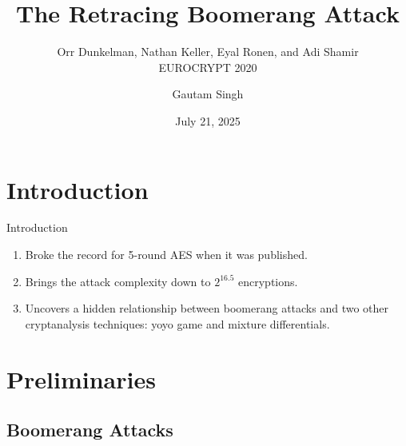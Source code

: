 \documentclass[notheorems]{beamer}
\title{The Retracing Boomerang Attack}
\subtitle{Orr Dunkelman, Nathan Keller, Eyal Ronen, and Adi Shamir\\EUROCRYPT 2020}
\author{Gautam Singh}
\institute[IITH]{Indian Institute of Technology Hyderabad}
\date{July 21, 2025}
\theoremstyle{definition}
\theoremstyle{example}
\begin{document}
    
    \begin{frame}
        \titlepage
    \end{frame}
    
    \begin{frame}
        \tableofcontents[hideallsubsections]
    \end{frame}
    
    \section{Introduction}
    \label{sec:intro}
    
    \begin{frame}[<+->]{Introduction}
        \begin{enumerate}
            \item Broke the record for 5-round AES when it was
            published.
            \item Brings the attack complexity down to \(2^{16.5}\)
            encryptions.
            \item Uncovers a hidden relationship between boomerang attacks and
            two other cryptanalysis techniques: yoyo game and mixture
            differentials.
        \end{enumerate}
    \end{frame}

    \section{Preliminaries}
    \label{sec:prelims}

    \subsection{Boomerang Attacks}
    \label{subsec:boomerang}
\end{document}
